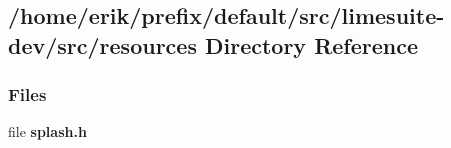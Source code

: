 \subsection{/home/erik/prefix/default/src/limesuite-\/dev/src/resources Directory Reference}
\label{dir_63ed991031c6514c448349be1e34ca6f}
\subsubsection*{Files}
\begin{DoxyCompactItemize}
\item 
file {\bf splash.\+h}
\end{DoxyCompactItemize}
